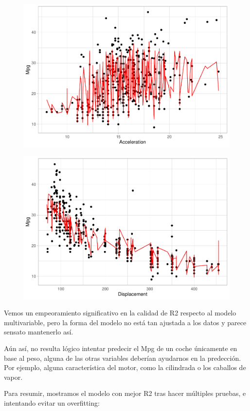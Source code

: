 \begin{figure}[H]\includegraphics[width=.9\linewidth]{img/Regresion_files/figure-latex/unnamed-chunk-24-2} \caption{}\end{figure}

\begin{figure}[H]\includegraphics[width=.9\linewidth]{img/Regresion_files/figure-latex/unnamed-chunk-24-3} \caption{}\end{figure}

Vemos un empeoramiento significativo en la calidad de R2 respecto al modelo multivariable, pero la forma del modelo no está tan ajustada a los datos y parece sensato mantenerlo así.

Aún así, no resulta lógico intentar predecir el Mpg de un coche únicamente en base al peso, alguna de las otras variables deberían ayudarnos en la predección. Por ejemplo, alguna característica del motor, como la cilindrada o los caballos de vapor.

Para resumir, mostramos el modelo con mejor R2 tras hacer múltiples pruebas, e intentando evitar un overfitting:

